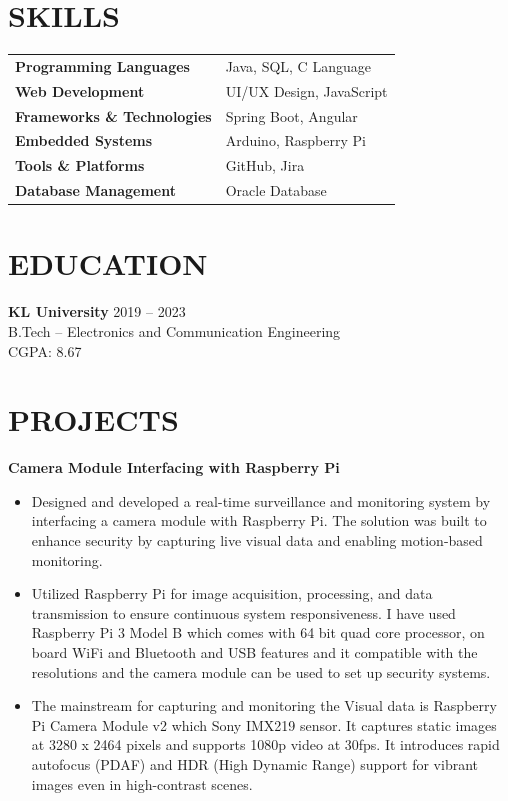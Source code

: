 \documentclass[a4paper,10pt]{article}
\begin{document}
\section*{SKILLS}

\begin{tabularx}{\textwidth}{X X}
\textbf{Programming Languages} & Java, SQL, C Language \\
\textbf{Web Development} & UI/UX Design, JavaScript \\
\textbf{Frameworks \& Technologies} & Spring Boot, Angular \\
\textbf{Embedded Systems} & Arduino, Raspberry Pi \\
\textbf{Tools \& Platforms} & GitHub, Jira \\
\textbf{Database Management} & Oracle Database \\

\end{tabularx}

\section*{EDUCATION}

\textbf{KL University} \hfill 2019 – 2023 \\
B.Tech – Electronics and Communication Engineering \\
CGPA: 8.67

\section*{PROJECTS}

\textbf{Camera Module Interfacing with Raspberry Pi}
\begin{itemize}[leftmargin=*]
\item Designed and developed a real-time surveillance and monitoring system by interfacing a camera module with Raspberry Pi. The solution was built to enhance security by capturing live visual data and enabling motion-based monitoring.
\item Utilized Raspberry Pi for image acquisition, processing, and data transmission to ensure continuous system responsiveness. I have used Raspberry Pi 3 Model B which comes with 64 bit quad core processor, on board WiFi and Bluetooth and USB features and it compatible with the resolutions and the camera module can be used to set up security systems.
\item The mainstream for capturing and monitoring the Visual data is Raspberry Pi Camera Module v2 which Sony IMX219 sensor. It captures static images at 3280 x 2464 pixels and supports 1080p video at 30fps. It introduces rapid autofocus (PDAF) and HDR (High Dynamic Range) support for vibrant images even in high-contrast scenes.
\end{itemize}
\end{document}
